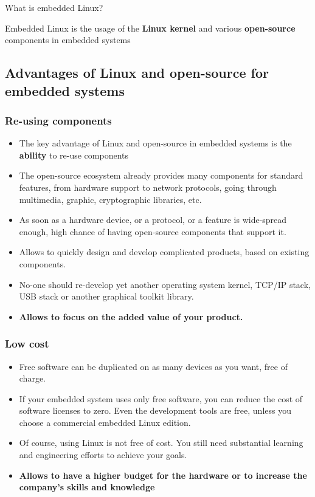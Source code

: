 \begin{frame}{What is embedded Linux?}
  \huge
  \begin{center}
    Embedded Linux is the usage of the {\bf Linux kernel} and various
    {\bf open-source} components in embedded systems
  \end{center}
\end{frame}

\subsection[Why embedded Linux?]{Advantages of Linux and open-source
  for embedded systems}

\begin{frame}
  \frametitle{Re-using components}
  \begin{itemize}
  \item The key advantage of Linux and open-source in embedded systems
    is the {\bf ability} to re-use components
  \item The open-source ecosystem already provides many components for
    standard features, from hardware support to network protocols,
    going through multimedia, graphic, cryptographic libraries, etc.
  \item As soon as a hardware device, or a protocol, or a feature is
    wide-spread enough, high chance of having open-source components
    that support it.
  \item Allows to quickly design and develop complicated products,
    based on existing components.
  \item No-one should re-develop yet another operating system kernel,
    TCP/IP stack, USB stack or another graphical toolkit library.
  \item {\bf Allows to focus on the added value of your product.}
  \end{itemize}
\end{frame}

\begin{frame}
  \frametitle{Low cost}
  \begin{itemize}
  \item Free software can be duplicated on as many devices as you
    want, free of charge.
  \item If your embedded system uses only free software, you can
    reduce the cost of software licenses to zero. Even the development
    tools are free, unless you choose a commercial embedded Linux
    edition.
  \item Of course, using Linux is not free of cost. You still need
    substantial learning and engineering efforts to achieve your
    goals. 
  \item {\bf Allows to have a higher budget for the hardware or to
      increase the company’s skills and knowledge}
  \end{itemize}
\end{frame}

